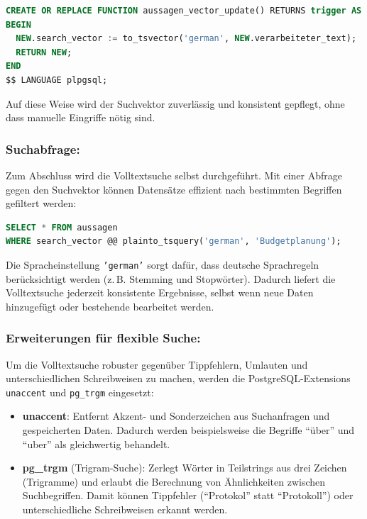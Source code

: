 \begin{lstlisting}[language=SQL, caption={Eigene Triggerfunktion zur Aktualisierung des Suchvektors}]
CREATE OR REPLACE FUNCTION aussagen_vector_update() RETURNS trigger AS $$
BEGIN
  NEW.search_vector := to_tsvector('german', NEW.verarbeiteter_text);
  RETURN NEW;
END
$$ LANGUAGE plpgsql;
\end{lstlisting}

Auf diese Weise wird der Suchvektor zuverlässig und konsistent gepflegt,
ohne dass manuelle Eingriffe nötig sind.

\subsubsection*{Suchabfrage:}
Zum Abschluss wird die Volltextsuche selbst durchgeführt. Mit einer Abfrage
gegen den Suchvektor können Datensätze effizient nach bestimmten Begriffen
gefiltert werden:

\begin{lstlisting}[language=SQL, caption={Beispiel für eine Volltextsuche}]
SELECT * FROM aussagen
WHERE search_vector @@ plainto_tsquery('german', 'Budgetplanung');
\end{lstlisting}

Die Spracheinstellung \texttt{'german'} sorgt dafür, dass deutsche Sprachregeln
berücksichtigt werden (z.\,B. Stemming und Stopwörter). Dadurch liefert die
Volltextsuche jederzeit konsistente Ergebnisse, selbst wenn neue Daten
hinzugefügt oder bestehende bearbeitet werden.

\subsubsection*{Erweiterungen für flexible Suche:}
Um die Volltextsuche robuster gegenüber Tippfehlern, Umlauten und 
unterschiedlichen Schreibweisen zu machen, werden die PostgreSQL-Extensions 
\texttt{unaccent} und \texttt{pg\_trgm} eingesetzt:

\begin{itemize}
    \item \textbf{unaccent}: Entfernt Akzent- und Sonderzeichen aus Suchanfragen 
    und gespeicherten Daten. Dadurch werden beispielsweise die Begriffe 
    \enquote{über} und \enquote{uber} als gleichwertig behandelt.
    
    \item \textbf{pg\_trgm} (Trigram-Suche): Zerlegt Wörter in Teilstrings aus 
    drei Zeichen (Trigramme) und erlaubt die Berechnung von Ähnlichkeiten 
    zwischen Suchbegriffen. Damit können Tippfehler (\enquote{Protokol} statt 
    \enquote{Protokoll}) oder unterschiedliche Schreibweisen erkannt werden.
\end{itemize}

